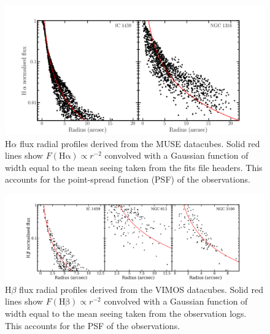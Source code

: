 \documentclass[a4paper,fleqn,usenatbib]{mnras}
\begin{document}
			\begin{figure}
				\centering
				\includegraphics[width=0.73\columnwidth]{Halpha_profile.png}
				\caption{H$\alpha$ flux radial profiles derived from the MUSE datacubes. Solid red lines show $F(\mathrm{H\alpha}) \propto r^{-2}$ convolved with a Gaussian function of width equal to the mean seeing taken from the fits file headers. This accounts for the point-spread function (PSF) of the observations.\label{fig:Ha_profile_MUSE}}
				\label{fig:Ha_profile_MUSE}
			\end{figure}

			\begin{figure}
				\centering
				\includegraphics[width=\columnwidth]{Hbeta_profile.png}
				\caption{H$\beta$ flux radial profiles derived from the VIMOS datacubes. Solid red lines show $F(\mathrm{H\beta}) \propto r^{-2}$ convolved with a Gaussian function of width equal to the mean seeing taken from the observation logs. This accounts for the PSF of the observations. \label{fig:Hb_profile_VIMOS}}
			\end{figure}
\end{document}
